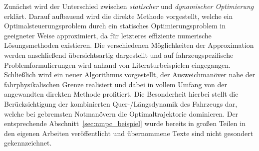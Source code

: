 Zunächst wird der Unterschied zwischen \emph{statischer} und \emph{dynamischer Optimierung} erklärt. 
Darauf aufbauend wird die direkte Methode vorgestellt, welche ein Optimalsteuerungsproblem durch ein statisches Optimierungsproblem in geeigneter Weise approximiert, da für letzteres effiziente numerische Lösungsmethoden existieren. Die verschiedenen Möglichkeiten der Approximation werden anschließend übersichtsartig dargestellt und auf fahrzeugspezifische Problemformulierungen wird anhand von Literaturbeispielen eingegangen. \\ %
%
Schließlich wird ein neuer Algorithmus vorgestellt, der Ausweichmanöver nahe der fahrphysikalischen Grenze realisiert und dabei in vollem Umfang von der angewandten direkten Methode profitiert. Die Besonderheit hierbei stellt die Berücksichtigung der kombinierten Quer-/Längsdynamik des Fahrzeugs dar, welche bei gebremsten Notmanövern die Optimaltrajektorie dominieren. Der entsprechende Abschnitt~\ref{sec:nmpc_beispiel} wurde bereits in großen Teilen in den eigenen Arbeiten  veröffentlicht und übernommene Texte sind nicht gesondert gekennzeichnet.





